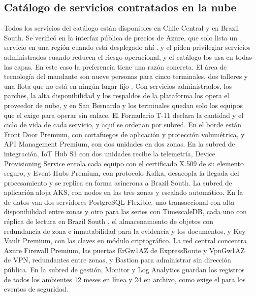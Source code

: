 \subsection{Catálogo de servicios contratados en la nube}\label{sec:4-catalogo}

Todos los servicios del catálogo están disponibles en Chile Central y en Brazil South. Se verificó en
la interfaz pública de precios de Azure, que solo lista un servicio en una región cuando está
desplegado ahí \parencite{ms_precios_api}.  y el  piden privilegiar
servicios administrados cuando reducen el riesgo operacional, y el catálogo los usa en todas las capas.
En este caso la preferencia tiene una razón concreta. El área de tecnología del mandante son nueve
personas para cinco terminales, dos talleres y una flota que no está en ningún lugar fijo
. Con servicios administrados, los parches, la alta disponibilidad y los
respaldos de la plataforma los opera el proveedor de nube, y en San Bernardo y los terminales quedan
solo los equipos que el  exige para operar sin enlace. El Formulario T-11 declara
la cantidad y el ciclo de vida de cada servicio, y aquí se ordenan por subred. En el borde están Front
Door Premium, con cortafuegos de aplicación y protección volumétrica, y API Management Premium, con
dos unidades en dos zonas. En la subred de integración, IoT Hub S1 con dos unidades recibe la
telemetría, Device Provisioning Service enrola cada equipo con el certificado X.509 de su elemento
seguro, y Event Hubs Premium, con protocolo Kafka, desacopla la llegada del procesamiento y se replica
en forma asíncrona a Brazil South. La subred de aplicación aloja AKS, con nodos en las tres zonas y
escalado automático. En la de datos van dos servidores PostgreSQL Flexible, uno transaccional con alta
disponibilidad entre zonas y otro para las series con TimescaleDB, cada uno con réplica de lectura en
Brazil South \parencite{ms_pg_overview}, el almacenamiento de objetos con redundancia de zona e
inmutabilidad para la evidencia y los documentos, y Key Vault Premium, con las claves en módulo
criptográfico. La red central concentra Azure Firewall Premium, las puertas ErGw1AZ de ExpressRoute y
VpnGw1AZ de VPN, redundantes entre zonas, y Bastion para administrar sin dirección pública. En la
subred de gestión, Monitor y Log Analytics guardan los registros de todos los ambientes 12 meses en
línea y 24 en archivo, como exige el  para los eventos de seguridad.

